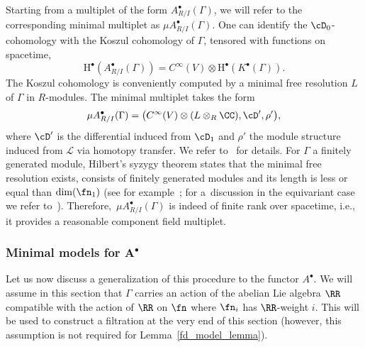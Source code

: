 \documentclass[10pt,a4paper]{amsart}
\numberwithin{equation}{section}
\def\sL{\mathscr L}
\begin{document}
Starting from a multiplet of the form $A^\bullet_{R/I}(\Gamma)$, we will refer to the corresponding minimal multiplet as $\mu A^\bullet_{R/I}(\Gamma)$.
One can identify the $\cD_0$-cohomology with the Koszul cohomology of $\Gamma$, tensored with functions on spacetime,
\begin{equation*}
\mathrm H^\bullet(A_{R/I}^\bullet(\Gamma)) = C^\infty(V) \otimes \mathrm H^\bullet(K^\bullet(\Gamma)) .
\end{equation*}
The Koszul cohomology is conveniently computed by a minimal free resolution $L$ of $\Gamma$ in $R$-modules. The minimal multiplet takes the form
\begin{equation*}
\mu A^\bullet_{R/I}(\Gamma) = \big( C^\infty(V) \otimes (L \otimes_R \CC) , \cD' ,\rho' \big) ,
\end{equation*}
where $\cD'$ is the differential induced from $\cD_1$ and $\rho'$ the module structure induced from $\sL$ via homotopy transfer. We refer to~\cite{perspectives} for details. For $\Gamma$ a finitely generated module, Hilbert's syzygy theorem states that the minimal free resolution exists, consists of finitely generated modules and its length is less or equal than $\dim(\fn_1)$ (see for example~\cite[Theorem 1.13]{MR1322960}; for a~discussion in the equivariant case we refer to~\cite[Proposition 2.4.9, Remark 2.4.10]{Galetto}). Therefore,~$\mu A_{R/I}^\bullet(\Gamma)$ is indeed of finite rank over spacetime, i.e., it provides a reasonable component field multiplet.

\subsubsection[Minimal models for A\^{}bullet]{Minimal models for $\boldsymbol{A^\bullet}$}

Let us now discuss a generalization of this procedure to the functor $A^\bullet$. We will assume in this section that $\Gamma$ carries an action of the abelian Lie algebra $\RR$ compatible with the action of $\RR$ on $\fn$ where $\fn_i$ has $\RR$-weight $i$. This will be used to construct a filtration at the very end of this section (however, this assumption is not required for Lemma~\ref{fd_model_lemma}).
\end{document}
